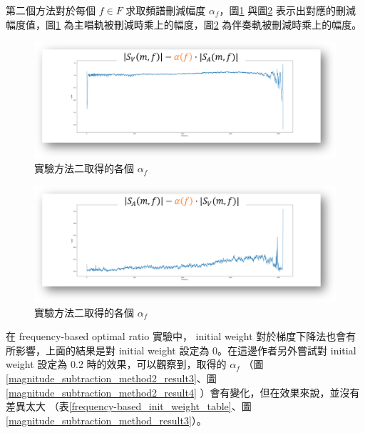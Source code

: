 第二個方法對於每個 $f\in F$ 求取頻譜刪減幅度 $\alpha_f$，圖\ref{magnitude_subtraction_method2_result1} 與圖\ref{magnitude_subtraction_method2_result2}  表示出對應的刪減幅度值，圖\ref{magnitude_subtraction_method2_result1} 為主唱軌被刪減時乘上的幅度，圖\ref{magnitude_subtraction_method2_result2} 為伴奏軌被刪減時乘上的幅度。

\begin{figure}[htbp]
    \hfil
    \begin{minipage}[t]{0.6\textwidth}
        \includegraphics[width=\textwidth]{./figures/chapter05_result/spectrogram_subtraction_nn_accompaniment-vocals_T-216.png}
        \caption {實驗方法二取得的各個 $\alpha_f$}
        \label{magnitude_subtraction_method2_result1}
    \end{minipage}
    \hfil
\end{figure}
\begin{figure}[htbp]
    \hfil
    \begin{minipage}[t]{0.6\textwidth}
        \includegraphics[width=\textwidth]{./figures/chapter05_result/spectrogram_subtraction_nn_vocals-accompaniment_T-216.png}
        \caption {實驗方法二取得的各個 $\alpha_f$}
        \label{magnitude_subtraction_method2_result2}
    \end{minipage}
    \hfil
\end{figure}

在 frequency-based optimal ratio 實驗中， initial weight 對於梯度下降法也會有所影響，上面的結果是對 initial weight 設定為 0。在這邊作者另外嘗試對 initial weight 設定為 0.2 時的效果，可以觀察到，取得的 $\alpha_f$ （圖\ref{magnitude_subtraction_method2_result3}、圖\ref{magnitude_subtraction_method2_result4} ）會有變化，但在效果來說，並沒有差異太大 （表\ref{frequency-based_init_weight_table}、圖\ref{magnitude_subtraction_method_result3}）。

